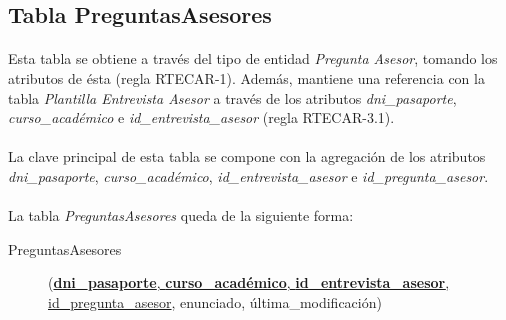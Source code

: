    \subsection{Tabla PreguntasAsesores}

      \paragraph{}Esta tabla se obtiene a través del tipo de entidad
      \textit{Pregunta Asesor}, tomando los atributos de ésta
      (regla RTECAR-1). Además, mantiene una referencia con la tabla
      \textit{Plantilla Entrevista Asesor} a través de los atributos
      \textit{dni\_pasaporte}, \textit{curso\_académico} e
      \textit{id\_entrevista\_asesor} (regla RTECAR-3.1).

      \paragraph{}La clave principal de esta tabla se compone con la agregación
      de los atributos \textit{dni\_pasaporte}, \textit{curso\_académico},
      \textit{id\_entrevista\_asesor} e \textit{id\_pregunta\_asesor}.

      \paragraph{}La tabla \textit{PreguntasAsesores} queda de la
      siguiente forma:

      \begin{description}
         \item[PreguntasAsesores] \begin{flushleft}(\underline{\textbf{dni\_pasaporte},
         \textbf{curso\_académico}, \textbf{id\_entrevista\_asesor},}
         \underline{id\_pregunta\_asesor}, enunciado, última\_modificación)\end{flushleft}
      \end{description}
